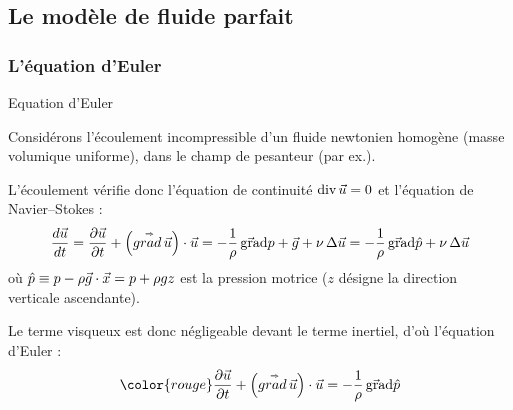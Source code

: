 \subsection{Le modèle de fluide parfait}

\subsubsection{L'équation d'Euler}
\begin{frame}{Equation d'Euler}

\small

Considérons l'écoulement incompressible d'un fluide newtonien homogène (masse volumique uniforme), dans le champ de pesanteur (par ex.).

\pause 

\medskip

L'écoulement vérifie donc l'équation de continuité 
$\mbox{\rm div}\, \vec{u} = 0$ et l'équation de Navier--Stokes :
\begin{equation}
  \displaystyle \frac{d \vec{u}}{dt} = \displaystyle \frac{\partial \vec{u}}{\partial t}  + \left( \accentset{\Rightarrow}{grad} \, \vec{u} \right) \cdot \vec{u}
  =
  - \frac{1}{\rho} \, \vec{\mbox{\rm gra}}\mbox{\rm d} p + \vec{g} 
  + \nu \, \Delta \vec{u}
  =
  - \frac{1}{\rho} \, \vec{\mbox{\rm gra}}\mbox{\rm d} \hat{p} 
  + \nu \, \Delta \vec{u}  
\end{equation}
o\`u $\hat{p} \equiv p - \rho \vec{g} \cdot \vec{x} = p + \rho g z$ 
est la pression motrice
($z$ désigne la direction verticale ascendante).

\bigskip

\pause
%
%

Le terme visqueux est donc négligeable devant le terme inertiel,
d'o\`u l'\textcolor{vert}{équation d'Euler} :
\begin{equation}
	\color{rouge} 
  \dpdt{\myvec{u}} + \left( \mytensor{grad} \, \myvec{u} \right) \cdot \myvec{u}
  =
  - \frac{1}{\rho} \, \gradient{\hat{p}}
\end{equation}

\vspace{20mm}

\end{frame}

